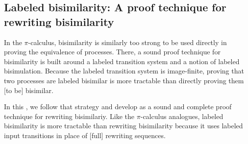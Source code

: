 \subsection{Labeled bisimilarity: A proof technique for rewriting bisimilarity}

In the $\pi$-calculus, bisimilarity is similarly too strong to be used directly in proving the equivalence of processes.
There, a sound proof technique for bisimilarity is built around a labeled transition system and a notion of labeled bisimulation.
Because the labeled transition system is image-finite, proving that two processes are labeled bisimilar is more tractable than directly proving them [to be] bisimilar.

In this , we follow that strategy and develop  as a sound and complete proof technique for rewriting bisimilariy.
Like the $\pi$-calculus analogues, labeled bisimilarity is more tractable than rewriting bisimilarity because it uses labeled input transitions in place of [full] rewriting sequences.

